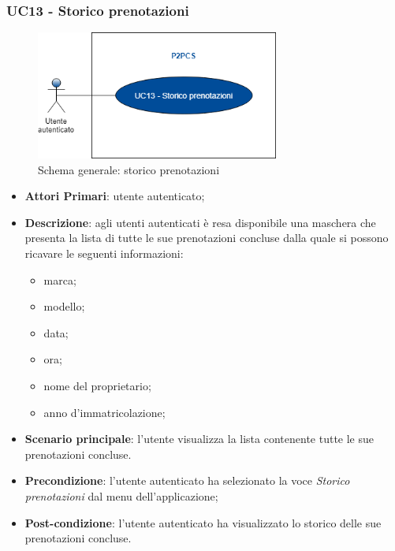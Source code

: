 \subsubsection{UC13 - Storico prenotazioni}
 \begin{figure}[h]
	\includegraphics[width=8cm]{res/images/Schemagenerale4.png}
	\centering
	\caption{Schema generale: storico prenotazioni}
\end{figure}
\begin{itemize}
	\item \textbf{Attori Primari}: utente autenticato;
	\item \textbf{Descrizione}: agli utenti autenticati è resa disponibile una maschera che presenta la lista di tutte le sue prenotazioni concluse dalla quale si possono ricavare le seguenti informazioni:
	\begin{itemize}
		\item marca;
		\item modello;
		\item data;
		\item ora;
		\item nome del proprietario;
		\item anno d'immatricolazione;
	\end{itemize} 
	\item \textbf{Scenario principale}: l'utente visualizza la lista contenente tutte le sue prenotazioni concluse.
	\item \textbf{Precondizione}: l'utente autenticato ha selezionato la voce \textit{Storico prenotazioni} dal menu dell'applicazione;
	\item \textbf{Post-condizione}: l'utente autenticato ha visualizzato lo storico delle sue prenotazioni concluse. 
\end{itemize} 
